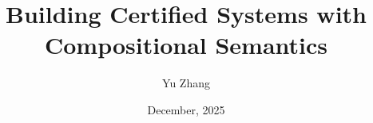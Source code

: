 \documentclass[letterpaper,11pt]{yalephd}
\theoremstyle{definition}
\begin{document}
\title{Building Certified Systems with Compositional Semantics}
\author{Yu Zhang}
\date{December, 2025} %

\newcommand{\todo}[1]{\textcolor{red}{#1}}
\newcommand{\kw}[1]{\ensuremath{ \mathsf{#1} }}
\newcommand{\C}{\ensuremath{ \mathcal{C} }}
\newcommand{\A}{\ensuremath{ \mathcal{A} }}
\newcommand{\que}{\circ}         %
\newcommand{\ans}{\bullet}       %
\newcommand{\termi}[1]{\langle {#1} ]}
\newcommand{\encap}[1]{[ {#1} \rangle}
\newcommand{\at}{\mathbin@}
\newcommand{\red}[1]{\textcolor{red}{#1}}
\newcommand{\ifr}[1]{\mathrel{[{#1}]}}
\newcommand{\idsc}{\mathbf{id}} %
\newcommand{\intl}[1]{#1^0}
\newcommand{\envstep}{\leadsto}
\newcommand{\sysstep}{\rightarrowtail}
\newcommand{\emptysig}{0}
\newcommand{\vcomp}{\fatsemi}
\newcommand{\jr}{\mathsf{Y}}
\newcommand*{\twoheadleftrightarrow}{%
  \twoheadleftarrow
  \mathrel{\mkern-15mu}%
  \twoheadrightarrow
}
\newcommand{\lensarrow}{\rightleftarrows}


\frontmatter
\end{document}
